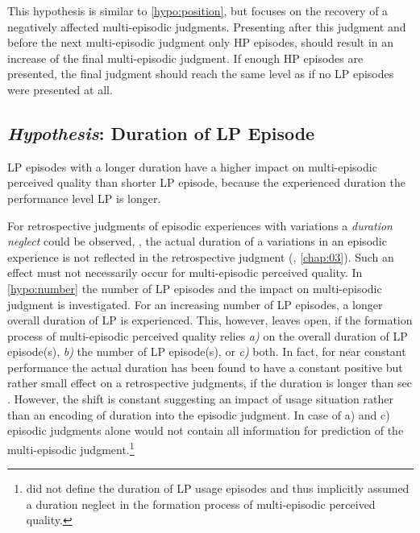 This hypothesis is similar to \autoref{hypo:position}, but focuses on the recovery of a negatively affected multi-episodic judgments.
Presenting after this judgment and before the next multi-episodic judgment only \ac{HP} episodes, should result in an increase of the final multi-episodic judgment.
If enough \ac{HP} episodes are presented, the final judgment should reach the same level as if no \ac{LP} episodes were presented at all.

\subsection{\emph{Hypothesis}: Duration of \acs{LP} Episode}
\begin{hypothesis}\label{hypo:duration}
\ac{LP} episodes with a longer duration have a higher impact on multi-episodic perceived quality than shorter \ac{LP} episode, because the experienced duration the performance level \ac{LP} is longer.
\end{hypothesis}

For retrospective judgments of episodic experiences with variations a \emph{duration neglect} could be observed, \ie, the actual duration of a variations in an episodic experience is not reflected in the retrospective judgment (\cf, \autoref{chap:03}).
Such an effect must not necessarily occur for multi-episodic perceived quality.
In \autoref{hypo:number} the number of \ac{LP} episodes and the impact on multi-episodic judgment is investigated.
For an increasing number of \ac{LP} episodes, a longer overall duration of \ac{LP} is experienced.
This, however, leaves open, if the formation process of multi-episodic perceived quality relies \emph{a)} on the overall duration of \ac{LP} episode(s), \emph{b)} the number of \ac{LP} episode(s), or \emph{c)} both.
In fact, for near constant performance the actual duration has been found to have a constant positive but rather small effect on a retrospective judgments, if the duration is longer than \unit[30]{sec} \citep[\cf,][]{frohlich_qoe_2012}.
However, the shift is constant suggesting an impact of usage situation rather than an encoding of duration into the episodic judgment.
In case of a) and c) episodic judgments alone would not contain all information for prediction of the multi-episodic judgment.\footnote{\citet[p.~2]{moller_single-call_2011} did not define the duration of \ac{LP} usage episodes and thus implicitly assumed a duration neglect in the formation process of multi-episodic perceived quality.}

